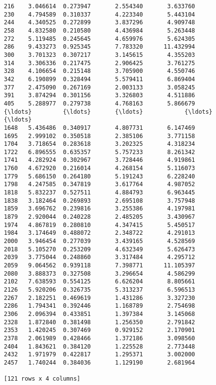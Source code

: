 \documentclass[11pt]{article}
\begin{document}
\begin{Verbatim}[commandchars=\\\{\}]
216    3.046614  0.273947       2.554340       3.633760
230    4.794589  0.310337       4.223340       5.443104
244    4.340525  0.272899       3.837296       4.909748
258    4.832580  0.210580       4.436984       5.263448
272    5.119485  0.245645       4.659976       5.624305
286    9.433273  0.925345       7.783320      11.432994
300    3.701323  0.307217       3.145615       4.355203
314    3.306336  0.217475       2.906425       3.761275
328    4.106654  0.215148       3.705900       4.550746
342    6.190899  0.328494       5.579411       6.869404
377    2.475090  0.267169       2.003133       3.058245
391    3.874294  0.301156       3.326803       4.511886
405    5.288977  0.279738       4.768163       5.866679
{\ldots}         {\ldots}       {\ldots}            {\ldots}            {\ldots}
1648   5.436486  0.340917       4.807731       6.147469
1695   2.999102  0.350518       2.385106       3.771158
1704   3.718654  0.283618       3.202325       4.318234
1722   6.896555  0.635357       5.757233       8.261342
1741   4.282924  0.302967       3.728446       4.919861
1760   4.672920  0.216014       4.268154       5.116073
1779   5.686150  0.264180       5.191243       6.228240
1798   4.247585  0.347819       3.617764       4.987052
1818   5.832237  0.527511       4.884793       6.963445
1838   3.182464  0.269893       2.695108       3.757948
1859   3.696762  0.239816       3.255386       4.197981
1879   2.920044  0.240228       2.485205       3.430967
1974   4.867819  0.280810       4.347415       5.450517
1984   3.174649  0.488072       2.348722       4.291013
2000   3.946454  0.277039       3.439165       4.528569
2018   5.105270  0.253209       4.632349       5.626473
2039   3.775044  0.248860       3.317484       4.295712
2059   9.064562  0.939118       7.398771      11.105397
2080   3.888373  0.327508       3.296654       4.586299
2102   7.638593  0.554125       6.626204       8.805661
2126   5.920206  0.326735       5.313237       6.596513
2267   2.182251  0.469619       1.431286       3.327230
2286   1.794341  0.392446       1.168789       2.754698
2306   2.096394  0.433851       1.397384       3.145068
2328   1.872840  0.381498       1.256350       2.791842
2353   1.420245  0.307469       0.929152       2.170901
2378   2.061989  0.428466       1.372186       3.098560
2404   1.843621  0.384120       1.225528       2.773448
2432   1.971979  0.422817       1.295371       3.002000
2457   1.740244  0.384036       1.129190       2.681964

[121 rows x 4 columns]

    \end{Verbatim}
\end{document}
